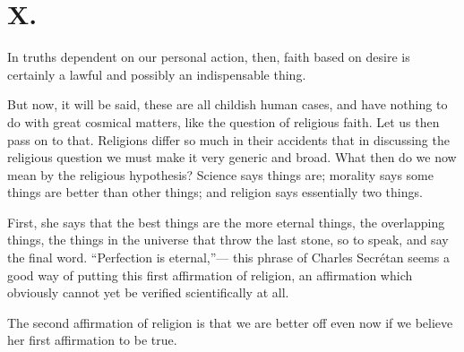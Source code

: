 \documentclass[12pt]{article}
\begin{document}
\section*{X.}

In truths dependent on our personal action, then, faith based on desire is certainly a lawful and possibly an indispensable thing.

But now, it will be said, these are all childish human cases, and have nothing to do with great cosmical matters, like the question of religious faith.  Let us then pass on to that.  Religions differ so much in their accidents that in discussing the religious question we must make it very generic and broad.  What then do we now mean by the religious hypothesis?  Science says things are; morality says some things are better than other things; and religion says essentially two things.

First, she says that the best things are the more eternal things, the overlapping things, the things in the universe that throw the last stone, so to speak, and say the final word.  ``Perfection is eternal,''--- this phrase of Charles Secr\'{e}tan seems a good way of putting this first affirmation of religion, an affirmation which obviously cannot yet be verified scientifically at all.


The second affirmation of religion is that we are better off even now if we believe her first affirmation to be true.
\end{document}

